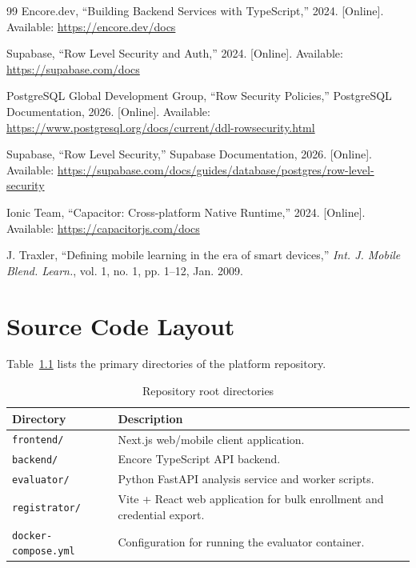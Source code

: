 \documentclass[12pt,a4paper,oneside]{report}
\begin{document}
\begin{thebibliography}{99}
    Encore.dev, ``Building Backend Services with TypeScript,'' 2024. [Online]. Available: \url{https://encore.dev/docs}

    Supabase, ``Row Level Security and Auth,'' 2024. [Online]. Available: \url{https://supabase.com/docs}

    PostgreSQL Global Development Group, ``Row Security Policies,'' PostgreSQL Documentation, 2026. [Online]. Available: \url{https://www.postgresql.org/docs/current/ddl-rowsecurity.html}

    Supabase, ``Row Level Security,'' Supabase Documentation, 2026. [Online]. Available: \url{https://supabase.com/docs/guides/database/postgres/row-level-security}

    Ionic Team, ``Capacitor: Cross-platform Native Runtime,'' 2024. [Online]. Available: \url{https://capacitorjs.com/docs}

    J. Traxler, ``Defining mobile learning in the era of smart devices,'' \textit{Int. J. Mobile Blend. Learn.}, vol. 1, no. 1, pp. 1--12, Jan. 2009.
    \end{thebibliography}

    \appendix
    \chapter{Source Code Layout}
    \label{app:layout}

    Table~\ref{tab:root_dirs} lists the primary directories of the platform repository.

    \begin{table}[H]
        \centering
        \caption{Repository root directories}
        \label{tab:root_dirs}
        \begin{tabular}{@{}ll@{}}
            \toprule
            \textbf{Directory} & \textbf{Description} \\
            \midrule
            \texttt{frontend/} & Next.js web/mobile client application. \\
            \texttt{backend/} & Encore TypeScript API backend. \\
            \texttt{evaluator/} & Python FastAPI analysis service and worker scripts. \\
            \texttt{registrator/} & Vite + React web application for bulk enrollment and credential export. \\
            \texttt{docker-compose.yml} & Configuration for running the evaluator container. \\
            \bottomrule
        \end{tabular}
    \end{table}

    
\end{document}
